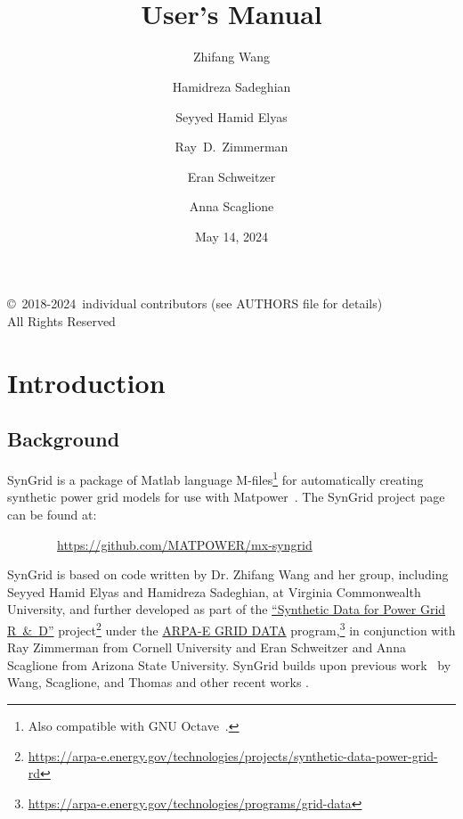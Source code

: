 \documentclass[12pt]{article}
\title{\syngrid{} \syngridver{}\\
User's Manual}
\author{Zhifang Wang \and Hamidreza Sadeghian \and Seyyed Hamid Elyas \and Ray~D.~Zimmerman \and Eran Schweitzer \and Anna Scaglione}
\date{May 14, 2024} %
\newcommand{\matlab}[0]{{\sc Matlab}}
\newcommand{\matpower}[0]{{\sc Matpower}}
\newcommand{\syngrid}[0]{{SynGrid}}
\newcommand{\syngridurl}[0]{https://github.com/MATPOWER/mx-syngrid}
\numberwithin{equation}{section}
\numberwithin{table}{section}
\numberwithin{figure}{section}
\begin{document}
\maketitle
\thispagestyle{empty}
\vfill
\begin{center}
{\scriptsize
\copyright~2018-2024~individual contributors (see AUTHORS file for details)\\
All Rights Reserved}
\end{center}

\clearpage
\tableofcontents
\clearpage
\listoffigures
\listoftables

\clearpage
\section{Introduction}

\subsection{Background}

\syngrid{} is a package of \matlab{} language M-files\footnote{Also compatible with GNU Octave~\cite{octave}.} for automatically creating synthetic power grid models for use with \matpower{}~\cite{zimmerman2011,matpower,matpower_manual}. The \syngrid{} project page can be found at:

\bigskip

~~~~~~~~\url{\syngridurl}

\bigskip

\syngrid{} is based on code written by Dr. Zhifang Wang and her group, including Seyyed Hamid Elyas and Hamidreza Sadeghian, at Virginia Commonwealth University, and further developed as part of the \href{https://arpa-e.energy.gov/technologies/projects/synthetic-data-power-grid-rd}{``Synthetic Data for Power Grid R~\&~D''} project\footnote{\url{https://arpa-e.energy.gov/technologies/projects/synthetic-data-power-grid-rd}} under the \href{https://arpa-e.energy.gov/technologies/programs/grid-data}{ARPA-E GRID DATA} program,\footnote{\url{https://arpa-e.energy.gov/technologies/programs/grid-data}} in conjunction with Ray Zimmerman from Cornell University and Eran Schweitzer and Anna Scaglione from Arizona State University.
\syngrid{} builds upon previous work~\cite{wang2008, syngrid_nestedSW} by Wang, Scaglione, and Thomas and other recent works \cite{wang2015, syngrid_bustype, syngrid_scaling, syngrid_gen, syngrid_transmissionline, syngrid_stat, schweitzer2018mathematical}.
\end{document}
